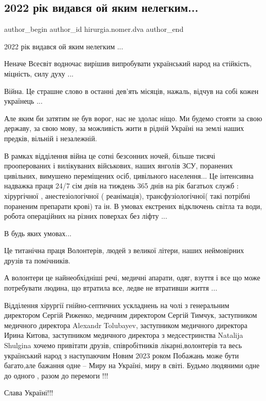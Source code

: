  
 
 
 
 

\subsection{2022 рік видався ой яким нелегким...}
\label{sec:27_12_2022.fb.hirurgia.nomer.dva.1.2022_r_k_vidavsya_oi}

\ifcmt
 author_begin
   author_id hirurgia.nomer.dva
 author_end
\fi

2022 рік видався ой яким нелегким ...

Неначе Всесвіт водночас вирішив випробувати український народ на стійкість,
міцність, силу духу ...

Війна. Це страшне слово в останні дев'ять місяців, нажаль, відчув на собі
кожен українець ... 

Але яким би затятим не був ворог, нас не здолає ніщо. Ми будемо стояти за свою
державу, за свою мову, за можливість жити в рідній Україні на землі наших
предків, вільній і незалежній.

В рамках відділення війна це сотні безсонних ночей, більше тисячі прооперованих
і вилікуваних військових, наших янголів ЗСУ, поранених цивільних, вимушено
переміщених осіб, цивільного населення...  Це інтенсивна надважка праця 24/7
сім днів на тиждень 365 днів на рік багатьох служб : хірургічної ,
анестезіологічної ( реанімація), трансфузіологічної( такі потрібні пораненим
препарати крові) та ін. В  умовах екстрених відключень світла та води, робота
операційних на різних поверхах без ліфту ...

В будь яких умовах...

Це титанічна праця Волонтерів, людей з великої літери, наших неймовірних друзів
та помічників.

А волонтери це найнеобхідніші речі, медичні апарати, одяг, взуття і все що може
потребувати людина, що втратила все, ледве не втративши життя ...

Відділення хірургії гнійно-септичних ускладнень на чолі з генеральним
директором Сергій Риженко, медичним директором Сергій Тимчук, заступником
медичного директора Alexandr Tolubayev, заступником медичного директора Ирина
Китова, заступником медичного директора з медсестринства Natalija  Shulgina
хочемо привітати друзів, співробітників лікарні,волонтерів та весь український
народ з наступаючим Новим 2023 роком Побажань може бути багато,але бажання одне
-- Миру на Україні, миру в світі. Будьмо людяними одне до одного , разом до
перемоги !!!

Слава Україні!!!
